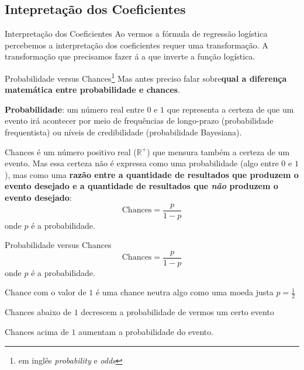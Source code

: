 \subsection{Intepretação dos Coeficientes}
\begin{frame}{Interpretação dos Coeficientes}
	Ao vermos a fórmula de regressão logística percebemos a interpretação dos
	coeficientes requer uma transformação. A transformação que precisamos fazer á a
	que inverte a função logística.
\end{frame}
\begin{frame}{Probabilidade versus Chances\footnote{em inglês \textit{probability} e
			\textit{odds}}}
	\small
	Mas antes preciso falar sobre\textbf{qual a diferença matemática
		entre probabilidade e chances}.
	\begin{vfilleditems}
		\item \small \textbf{Probabilidade}: um número real entre $0$ e $1$ que
		representa a certeza de que um evento irá acontecer por meio de frequências
		de longo-prazo (probabilidade frequentista) ou níveis de credibilidade
		(probabilidade Bayesiana).
		\item \small Chances é um número positivo real ($\mathbb{R}^+$) que mensura
		também a certeza de um evento. Mas essa certeza não é expressa como uma
		probabilidade (algo entre $0$ e $1$), mas como uma \textbf{razão entre a
			quantidade de resultados que produzem o evento desejado e a quantidade de
			resultados que \textit{não} produzem o evento desejado}:
		$$
			\text{Chances} = \frac{p}{1-p}
		$$
		onde $p$ é a probabilidade.
	\end{vfilleditems}
\end{frame}

\begin{frame}{Probabilidade versus Chances}
	$$
		\text{Chances} = \frac{p}{1-p}
	$$
	onde $p$ é a probabilidade.
	\vfill
	\begin{vfilleditems}
		\item Chance com o valor de $1$ é uma chance neutra
		algo como uma moeda justa $p = \frac{1}{2}$
		\item Chances abaixo de $1$ decrescem a probabilidade de vermos um
		certo evento
		\item Chances acima de $1$ aumentam a probabilidade do evento.
	\end{vfilleditems}
\end{frame}

